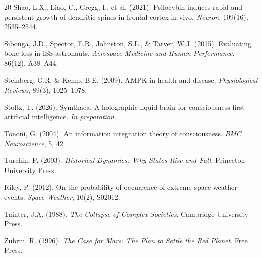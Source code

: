 \documentclass[12pt,a4paper]{article}
\begin{document}
\begin{thebibliography}{20}
Shao, L.X., Liao, C., Gregg, I., et al. (2021).
Psilocybin induces rapid and persistent growth of dendritic spines in frontal cortex in vivo.
\textit{Neuron}, 109(16), 2535--2544.

Sibonga, J.D., Spector, E.R., Johnston, S.L., \& Tarver, W.J. (2015).
Evaluating bone loss in ISS astronauts.
\textit{Aerospace Medicine and Human Performance}, 86(12), A38--A44.

Steinberg, G.R. \& Kemp, B.E. (2009).
AMPK in health and disease.
\textit{Physiological Reviews}, 89(3), 1025--1078.

Stoltz, T. (2026).
Symthaea: A holographic liquid brain for consciousness-first artificial intelligence.
\textit{In preparation}.

Tononi, G. (2004).
An information integration theory of consciousness.
\textit{BMC Neuroscience}, 5, 42.

Turchin, P. (2003).
\textit{Historical Dynamics: Why States Rise and Fall}.
Princeton University Press.

Riley, P. (2012).
On the probability of occurrence of extreme space weather events.
\textit{Space Weather}, 10(2), S02012.

Tainter, J.A. (1988).
\textit{The Collapse of Complex Societies}.
Cambridge University Press.

Zubrin, R. (1996).
\textit{The Case for Mars: The Plan to Settle the Red Planet}.
Free Press.

\end{thebibliography}
\end{document}
